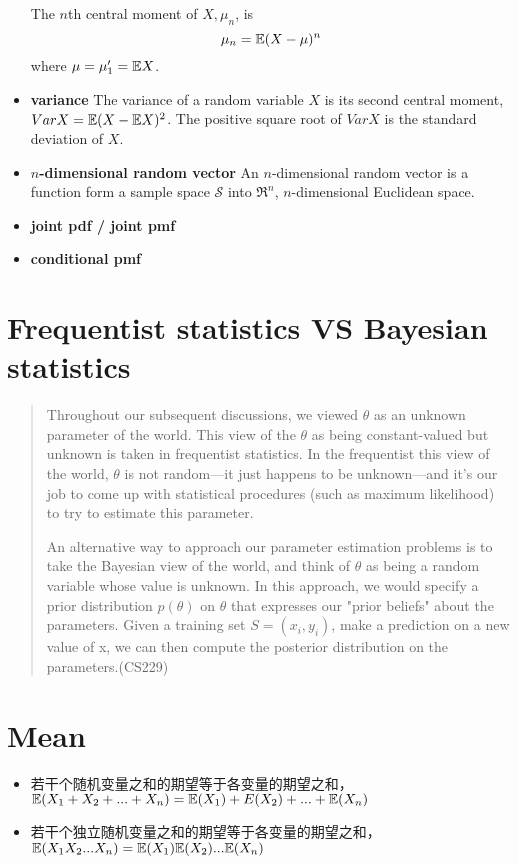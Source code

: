 \begin{itemize}
        The $n$th central moment of $X, \mu_n$, is
        \begin{equation}
            \mu_n = \mathbb{E}(X - \mu)^n
        \end{equation}
        where $\mu = \mu_1' = \mathbb{E} X$.
    \item \textbf{variance} The variance of a random variable $X$ is its second central moment, $Var X = \mathbb{E}(X - \mathbb{E} X)^2$. The positive square root of $Var X$ is the standard deviation of $X$.
    \item \textbf{$n$-dimensional random vector} An $n$-dimensional random vector is a function form a sample space $\mathcal{S}$ into $\mathfrak{R}^n$, $n$-dimensional Euclidean space.
    \item \textbf{joint pdf / joint pmf}
    \item \textbf{conditional pmf}
\end{itemize}

\section{Frequentist statistics VS Bayesian statistics}
\begin{quotation}
Throughout our subsequent discussions, we viewed $\theta$ as an unknown parameter of the world.
This view of the $\theta$ as being constant-valued but unknown is taken in frequentist statistics.
In the frequentist this view of the world, $\theta$ is not random—it just happens to be unknown—and
it's our job to come up with statistical procedures (such as maximum likelihood) to try to estimate
this parameter.

An alternative way to approach our parameter estimation problems is to take
the Bayesian view of the world, and think of $\theta$ as being a random variable whose value is
unknown. In this approach, we would specify a prior distribution $p(\theta)$ on $\theta$ that
expresses our "prior beliefs" about the parameters. Given a training set $S = {(x_i, y_i)}$,
make a prediction on a new value of x, we can then compute the posterior distribution on
the parameters.(CS229)
\end{quotation}

\section{Mean}
\begin{itemize}
    \item 若干个随机变量之和的期望等于各变量的期望之和，$\mathbb{E}(X_1 + X_2 + ... + X_n) = \mathbb{E}(X_1) + E(X_2) + ... + \mathbb{E}(X_n)$
    \item 若干个独立随机变量之和的期望等于各变量的期望之和，$\mathbb{E}(X_1 X_2 ... X_n) = \mathbb{E}(X_1)\mathbb{E}(X_2)...\mathbb{E}(X_n)$
\end{itemize}

